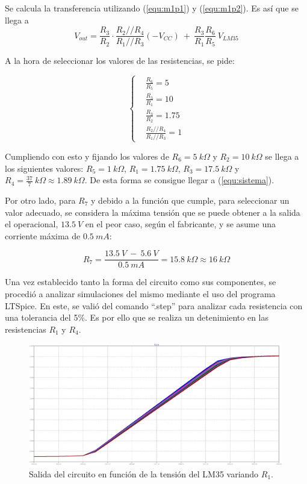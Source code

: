 \documentclass[a4paper]{article}
\begin{document}
Se calcula la transferencia utilizando (\ref{equ:m1p1}) y (\ref{equ:m1p2}). Es así que se llega a
\begin{equation}
	V_{out} = \frac{R_3}{R_2} \cdot \frac{R_2 // R_4}{R_1 // R_3} \left( -V_{CC} \right) \ + \
	\frac{R_3}{R_1} \frac{R_6}{R_5} \ V_{LM35}
	\label{equ:transfm1}
\end{equation}

A la hora de seleccionar los valores de las resistencias, se pide:

\begin{equation*}
\left\{
\begin{aligned}
  		&	\frac{R_6}{R_5} = 5	\\
  		&	\frac{R_3}{R_1} = 10	\\
  		&	\frac{R_3}{R_2} = 1.75	\\
  		&	\frac{R_2 // R_4}{R_1 // R_3} = 1
\end{aligned}
\right.
\end{equation*}

Cumpliendo con esto y fijando los valores de $R_6 = 5 \ k\Omega$ y $R_2 = 10 \ k\Omega$ se llega a los siguientes valores: $R_5 = 1 \ k\Omega$, $R_1 = 1.75 \ k\Omega$, $R_3 = 17.5 \ k\Omega$ y $R_4 = \frac{37}{7} \ k\Omega \approx 1.89 \ k\Omega$. De esta forma se consigue llegar a (\ref{equ:sistema}).

Por otro lado, para $R_7$ y debido a la función que cumple, para seleccionar un valor adecuado, se considera la máxima tensión que se puede obtener a la salida el operacional, $13.5 \ V$ en el peor caso, según el fabricante, y se asume una corriente máxima de $0.5 \ mA$:

\begin{equation}
	R_7 = \frac{13.5 \ V \ - \ 5.6 \ V}{0.5 \ mA} = 15.8 \ k\Omega \approx 16 \ k\Omega
	\label{equ:rzener}
\end{equation}

Una vez establecido tanto la forma del circuito como sus componentes, se procedió a analizar simulaciones del mismo mediante el uso del programa LTSpice. En este, se valió del comando ``.step'' para analizar cada resistencia con una tolerancia del 5\%. Es por ello que se realiza un detenimiento en las resistencias $R_1$ y $R_4$.

\begin{figure}[H]
	\centering
	\includegraphics[width=0.99\textwidth]{Ejercicio6/Imagenes/StepR1-M1.png}
	\caption{Salida del circuito en función de la tensión del LM35 variando $R_1$.}
	\label{fig:r1-M1}
\end{figure}
\end{document}
